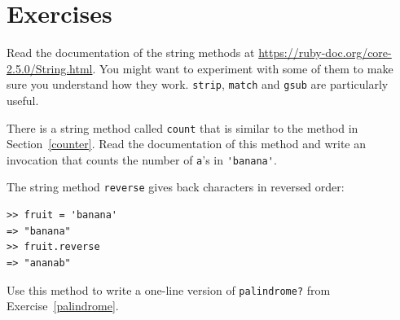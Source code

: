 \documentclass[10pt]{book}
\begin{document}
\section{Exercises}

\begin{exercise}

Read the documentation of the string methods at
\url{https://ruby-doc.org/core-2.5.0/String.html}.
You might want to experiment with some of them to make sure you
understand how they work.  {\tt strip}, {\tt match} and {\tt gsub} are
particularly useful.


\end{exercise}


\begin{exercise}

There is a string method called {\tt count} that is similar
to the method in Section~\ref{counter}.  Read the documentation
of this method
and write an invocation that counts the number of {\tt a}'s
in \verb"'banana'".
\end{exercise}


\begin{exercise}

The string method {\tt reverse} gives back characters in reversed order:

\begin{verbatim}
>> fruit = 'banana'
=> "banana"
>> fruit.reverse
=> "ananab"
\end{verbatim}

Use this method to write a one-line version of \verb"palindrome?"
from Exercise~\ref{palindrome}.
\end{exercise}
\end{document}
